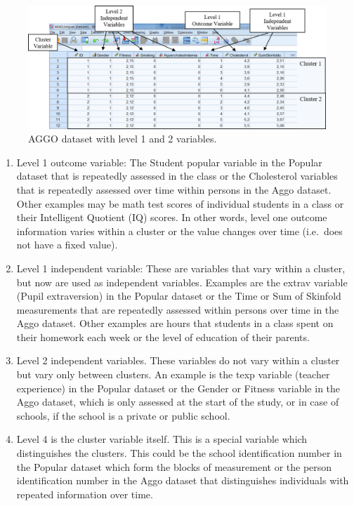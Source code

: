 \documentclass[
]{book}
\begin{document}
\begin{figure}

{\centering \includegraphics[width=0.9\linewidth]{images/fig7.4} 

}

\caption{AGGO dataset with level 1 and 2 variables.}\label{fig:fig73}
\end{figure}

\begin{enumerate}
\def\labelenumi{\arabic{enumi})}
\item
  Level 1 outcome variable: The Student popular variable in the Popular dataset that is repeatedly assessed in the class or the Cholesterol variables that is repeatedly assessed over time within persons in the Aggo dataset. Other examples may be math test scores of individual students in a class or their Intelligent Quotient (IQ) scores. In other words, level one outcome information varies within a cluster or the value changes over time (i.e.~does not have a fixed value).
\item
  Level 1 independent variable: These are variables that vary within a cluster, but now are used as independent variables. Examples are the extrav variable (Pupil extraversion) in the Popular dataset or the Time or Sum of Skinfold measurements that are repeatedly assessed within persons over time in the Aggo dataset. Other examples are hours that students in a class spent on their homework each week or the level of education of their parents.
\item
  Level 2 independent variables. These variables do not vary within a cluster but vary only between clusters. An example is the texp variable (teacher experience) in the Popular dataset or the Gender or Fitness variable in the Aggo dataset, which is only assessed at the start of the study, or in case of schools, if the school is a private or public school.
\item
  Level 4 is the cluster variable itself. This is a special variable which distinguishes the clusters. This could be the school identification number in the Popular dataset which form the blocks of measurement or the person identification number in the Aggo dataset that distinguishes individuals with repeated information over time.
\end{enumerate}
\end{document}
